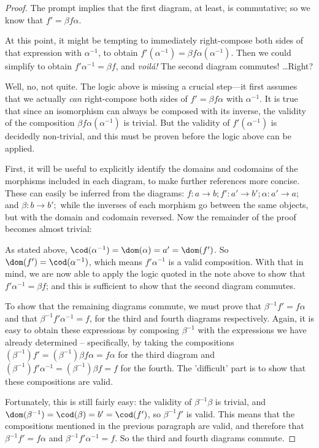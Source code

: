\documentclass[main.tex]{subfiles}
\begin{document}
\begin{proof}
	The prompt implies that the first diagram, at least, is
	commutative; so we know that \(f' = \beta f \alpha \).

	At this point, it might be tempting to immediately right-compose both sides
	of that expression with \(\alpha^{-1}\), to obtain \(f'(\alpha^{-1}) = \beta
	f \alpha(\alpha^{-1})\). Then we could simplify to obtain \(f' \alpha^{-1} =
	\beta f\), and \textit{voil\'{a}!} The second diagram commutes! \dots Right?

	Well, no, not quite. The logic above is missing a crucial step---it first
	assumes that we actually \textit{can} right-compose both sides of \(f' =
	\beta f \alpha \) with \(\alpha^{-1}\). It is true that since an isomorphism
	can always be composed with its inverse, the validity of the composition
	\(\beta f \alpha (\alpha^{-1})\) is trivial. But the validity of \(f'
	(\alpha^{-1})\) is decidedly non-trivial, and this must be proven before the
	logic above can be applied.

	First, it will be useful to explicitly identify the domains and codomains of the
	morphisms included in each diagram, to make further references more concise.
	These can easily be inferred from the diagrams: \(f \colon a \to b; f' \colon a'
	\to b'; \alpha \colon a' \to a;\) and \(\beta \colon b \to b';\) while the
	inverses of each morphism go between the same objects, but with the domain and
	codomain reversed. Now the remainder of the proof becomes almost trivial:

	As stated above, \(\cod(\alpha^{-1}) = \dom(\alpha) = a' = \dom (f')\). So
	\(\dom(f') = \cod(\alpha^{-1})\), which means \(f' \alpha^{-1}\) is a valid
	composition. With that in mind, we are now able to apply the logic quoted in the
	note above to show that \(f' \alpha^{-1} = \beta f\); and this is sufficient to
	show that the second diagram commutes.

	To show that the remaining diagrams commute, we must prove that \(\beta^{-1} f'
	= f \alpha\) and that \(\beta^{-1} f' \alpha^{-1} = f\), for the third and
	fourth diagrams respectively. Again, it is easy to obtain these expressions by
	composing \(\beta^{-1}\) with the expressions we have already determined --
	specifically, by taking the compositions \((\beta^{-1})f' = (\beta^{-1})\beta f
	\alpha = f \alpha\) for the third diagram and \((\beta^{-1})f' \alpha^{-1} =
	(\beta^{-1})\beta f = f\) for the fourth. The 'difficult' part is to show that
	these compositions are valid.

	Fortunately, this is still fairly easy: the validity of \(\beta^{-1} \beta\) is
	trivial, and \(\dom(\beta^{-1}) = \cod(\beta) = b' = \cod(f')\), so \(\beta^{-1}
	f'\) is valid. This means that the compositions mentioned in the previous
	paragraph are valid, and therefore that \(\beta^{-1} f' = f \alpha\) and
	\(\beta^{-1} f' \alpha^{-1} = f\). So the third and fourth diagrams commute.
\end{proof}
\end{document}
